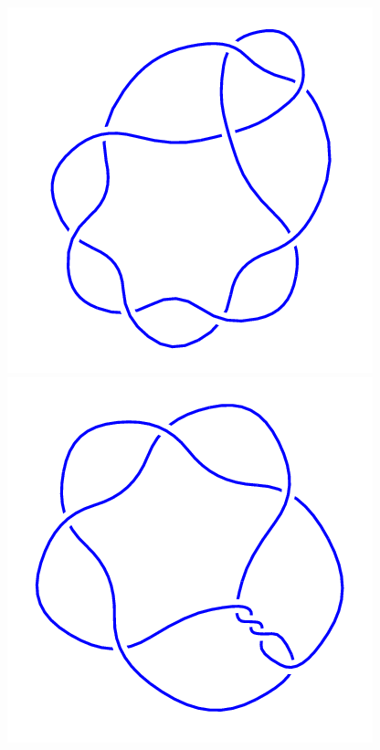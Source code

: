 \begin{figure}[H]
	\begin{minipage}[b]{.18\linewidth}
		\centering
		\includegraphics[width=\linewidth]{../data/8_2.png}
	\end{minipage}
	\begin{minipage}[b]{.18\linewidth}
		\centering
		\includegraphics[width=\linewidth]{../data/8_3.png}

\end{minipage}
\end{figure}
